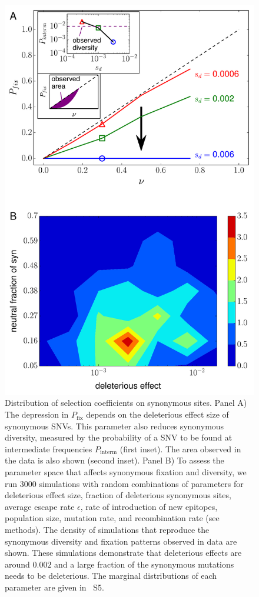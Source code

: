 \documentclass[11pt]{article}
\newcommand{\pfix}{P_{\mathrm{fix}}}
\newcommand{\marginals}{5}
\begin{document}
\begin{figure}
\begin{center}
\includegraphics[width=0.6\linewidth]{fig4}
\caption{Distribution of selection coefficients on synonymous sites. Panel A)
The depression in $\pfix$ depends on the deleterious effect size 
of synonymous SNVs. This parameter also reduces synonymous
diversity, measured by the probability of a SNV to be found at
intermediate frequencies $P_\text{interm}$ (first inset). The area observed in
the data is also shown (second inset).
Panel B) To assess the parameter space that affects synonymous fixation and
diversity, we run 3000 simulations with random combinations of parameters for deleterious effect
size, fraction of deleterious synonymous sites, average escape rate $\epsilon$,
rate of introduction of new epitopes, population size, mutation rate, and
recombination rate (see methods). The density of simulations that reproduce
the synonymous diversity and fixation patterns observed in data are shown.
These simulations demonstrate that deleterious effects are around $0.002$
and a large fraction of the synonymous mutations needs to be
deleterious. The marginal distributions of each parameter are given in
\figurename~S\marginals.} 
\label{fig:simheat}
\end{center}
\end{figure}

%
\end{document}
